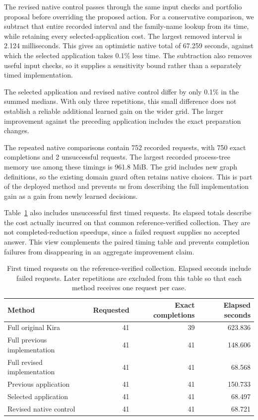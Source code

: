 The revised native control passes through the same input checks and portfolio proposal before overriding the proposed action. For a conservative comparison, we subtract that entire recorded interval and the family-name lookup from its time, while retaining every selected-application cost. The largest removed interval is 2.124 milliseconds. This gives an optimistic native total of 67.259 seconds, against which the selected application takes 0.1\% less time. The subtraction also removes useful input checks, so it supplies a sensitivity bound rather than a separately timed implementation.

The selected application and revised native control differ by only 0.1\% in the summed medians. With only three repetitions, this small difference does not establish a reliable additional learned gain on the wider grid. The larger improvement against the preceding application includes the exact preparation changes.

The repeated native comparisons contain 752 recorded requests, with 750 exact completions and 2 unsuccessful requests. The largest recorded process-tree memory use among these timings is 961.8 MiB. The grid includes new graph definitions, so the existing domain guard often retains native choices. This is part of the deployed method and prevents us from describing the full implementation gain as a gain from newly learned decisions.

Table~\ref{tab:coverage-completion} also includes unsuccessful first timed requests. Its elapsed totals describe the cost actually incurred on that common reference-verified collection. They are not completed-reduction speedups, since a failed request supplies no accepted answer. This view complements the paired timing table and prevents completion failures from disappearing in an aggregate improvement claim.
\begin{table}[!htbp]\centering\small
\caption{First timed requests on the reference-verified collection. Elapsed seconds include failed requests. Later repetitions are excluded from this table so that each method receives one request per case.}
\label{tab:coverage-completion}
\begin{tabular}{@{}lrrr@{}}\toprule
Method & Requested & Exact completions & Elapsed seconds\\\midrule
Full original Kira & 41 & 39 & 623.836\\
Full previous implementation & 41 & 41 & 148.606\\
Full revised implementation & 41 & 41 & 68.568\\
Previous application & 41 & 41 & 150.733\\
Selected application & 41 & 41 & 68.497\\
Revised native control & 41 & 41 & 68.721\\
\bottomrule\end{tabular}
\end{table}

